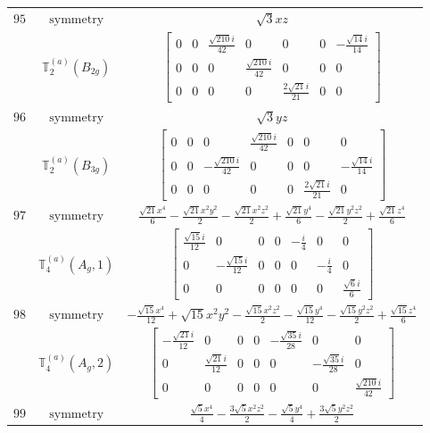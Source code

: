 \documentclass[fleqn,8pt,landscape]{jsarticle}
\begin{document}
\begin{longtable}{ccc}
$ 95 $ & $ \text{symmetry} $ & $ \sqrt{3} x z $ \\
$  $ & $ \mathbb{T}_{2}^{(a)}(B_{2g}) $ & $ \begin{bmatrix} 0 & 0 & \frac{\sqrt{210} i}{42} & 0 & 0 & 0 & - \frac{\sqrt{14} i}{14} \\ 0 & 0 & 0 & \frac{\sqrt{210} i}{42} & 0 & 0 & 0 \\ 0 & 0 & 0 & 0 & \frac{2 \sqrt{21} i}{21} & 0 & 0 \end{bmatrix} $ \\ \hline
$ 96 $ & $ \text{symmetry} $ & $ \sqrt{3} y z $ \\
$  $ & $ \mathbb{T}_{2}^{(a)}(B_{3g}) $ & $ \begin{bmatrix} 0 & 0 & 0 & \frac{\sqrt{210} i}{42} & 0 & 0 & 0 \\ 0 & 0 & - \frac{\sqrt{210} i}{42} & 0 & 0 & 0 & - \frac{\sqrt{14} i}{14} \\ 0 & 0 & 0 & 0 & 0 & \frac{2 \sqrt{21} i}{21} & 0 \end{bmatrix} $ \\ \hline
$ 97 $ & $ \text{symmetry} $ & $ \frac{\sqrt{21} x^{4}}{6} - \frac{\sqrt{21} x^{2} y^{2}}{2} - \frac{\sqrt{21} x^{2} z^{2}}{2} + \frac{\sqrt{21} y^{4}}{6} - \frac{\sqrt{21} y^{2} z^{2}}{2} + \frac{\sqrt{21} z^{4}}{6} $ \\
$  $ & $ \mathbb{T}_{4}^{(a)}(A_{g},1) $ & $ \begin{bmatrix} \frac{\sqrt{15} i}{12} & 0 & 0 & 0 & - \frac{i}{4} & 0 & 0 \\ 0 & - \frac{\sqrt{15} i}{12} & 0 & 0 & 0 & - \frac{i}{4} & 0 \\ 0 & 0 & 0 & 0 & 0 & 0 & \frac{\sqrt{6} i}{6} \end{bmatrix} $ \\ \hline
$ 98 $ & $ \text{symmetry} $ & $ - \frac{\sqrt{15} x^{4}}{12} + \sqrt{15} x^{2} y^{2} - \frac{\sqrt{15} x^{2} z^{2}}{2} - \frac{\sqrt{15} y^{4}}{12} - \frac{\sqrt{15} y^{2} z^{2}}{2} + \frac{\sqrt{15} z^{4}}{6} $ \\
$  $ & $ \mathbb{T}_{4}^{(a)}(A_{g},2) $ & $ \begin{bmatrix} - \frac{\sqrt{21} i}{12} & 0 & 0 & 0 & - \frac{\sqrt{35} i}{28} & 0 & 0 \\ 0 & \frac{\sqrt{21} i}{12} & 0 & 0 & 0 & - \frac{\sqrt{35} i}{28} & 0 \\ 0 & 0 & 0 & 0 & 0 & 0 & \frac{\sqrt{210} i}{42} \end{bmatrix} $ \\ \hline
$ 99 $ & $ \text{symmetry} $ & $ \frac{\sqrt{5} x^{4}}{4} - \frac{3 \sqrt{5} x^{2} z^{2}}{2} - \frac{\sqrt{5} y^{4}}{4} + \frac{3 \sqrt{5} y^{2} z^{2}}{2} $ \\

\end{longtable}
\end{document}
